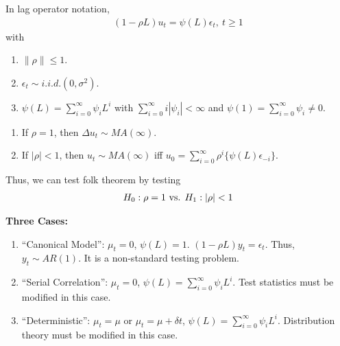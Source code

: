 \documentclass[11pt]{elegantbook}
\begin{document}
In lag operator notation,
\begin{equation}
    \begin{aligned}
        (1-\rho L)u_t=\psi(L)\epsilon_t,\ t\geq 1
    \end{aligned}
    \nonumber
\end{equation}
with
\begin{enumerate}
    \item $\|\rho\|\leq 1$.
    \item $\epsilon_t\sim{i.i.d.}(0,\sigma^2)$.
    \item $\psi(L)=\sum_{i=0}^\infty \psi_i L^i$ with $\sum_{i=0}^\infty i|\psi_i|<\infty$ and $\psi(1)=\sum_{i=0}^\infty \psi_i\neq 0$.
\end{enumerate}

\begin{remark}
    \begin{enumerate}
        \item If $\rho=1$, then $\Delta u_t\sim MA(\infty)$.
        \item If $|\rho|<1$, then $u_t\sim MA(\infty)$ iff $u_0=\sum_{i=0}^\infty \rho^i\{\psi(L)\epsilon_{-i}\}$.
    \end{enumerate}
    Thus, we can test folk theorem by testing
    \begin{equation}
        \begin{aligned}
            H_0: \rho=1 \textnormal{ vs. } H_1: |\rho|<1
        \end{aligned}
        \nonumber
    \end{equation}
\end{remark}

\textbf{Three Cases:}
\begin{enumerate}
    \item ``Canonical Model'': $\mu_t=0$, $\psi(L)=1$. $(1-\rho L)y_t=\epsilon_t$. Thus, $y_t\sim AR(1)$. It is a non-standard testing problem.
    \item ``Serial Correlation'': $\mu_t=0$, $\psi(L)=\sum_{i=0}^\infty \psi_i L^i$. Test statistics must be modified in this case.
    \item ``Deterministic'': $\mu_t=\mu$ or $\mu_t=\mu+\delta t$, $\psi(L)=\sum_{i=0}^\infty \psi_i L^i$. Distribution theory must be modified in this case.
\end{enumerate}
\end{document}
